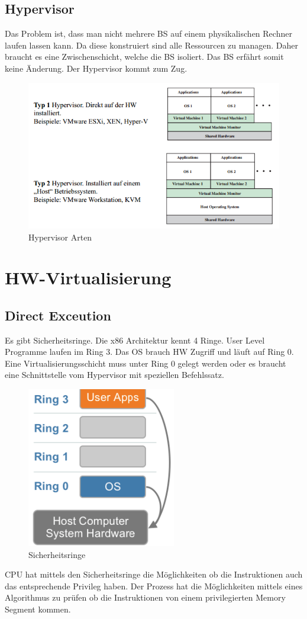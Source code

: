 \subsection{Hypervisor}
Das Problem ist, dass man nicht mehrere BS auf einem physikalischen Rechner laufen lassen kann. Da diese konstruiert sind alle Ressourcen zu managen. Daher braucht es eine Zwischenschicht, welche die BS isoliert. Das BS erfährt somit keine Änderung. Der Hypervisor kommt zum Zug.

\begin{figure}[h!]
\centering
\includegraphics[width=0.8\linewidth]{fig/hypervisor-types}
\caption{Hypervisor Arten}
\label{fig:hypervisor-types}
\end{figure}

\section{HW-Virtualisierung}
\subsection{Direct Exceution}
Es gibt Sicherheitsringe. Die x86 Architektur kennt 4 Ringe. User Level Programme laufen im Ring 3. Das OS brauch HW Zugriff und läuft auf Ring 0. Eine Virtualisierungsschicht muss unter Ring 0 gelegt werden oder es braucht eine Schnittstelle vom Hypervisor mit speziellen Befehlssatz. 
\begin{figure}[h!]
\centering
\includegraphics[width=0.4\linewidth]{fig/sicherheitsringe}
\caption{Sicherheitsringe}
\label{fig:sicherheitsringe}
\end{figure}
CPU hat mittels den Sicherheitsringe die Möglichkeiten ob die Instruktionen auch das entsprechende Privileg haben. Der Prozess hat die Möglichkeiten mittels eines Algorithmus zu prüfen ob die Instruktionen von einem privilegierten Memory Segment kommen.

